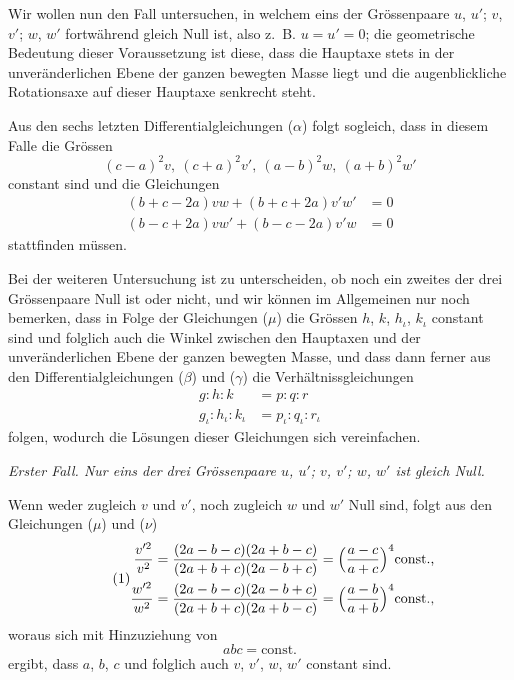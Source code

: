\documentclass[12pt,a4paper]{article}
\begin{document}
Wir wollen nun den Fall untersuchen, in welchem eins der Grössenpaare $u$, $u'$; $v$, $v'$; $w$, $w'$ fortwährend gleich Null ist, also z.~B. $u = u' = 0$; die geometrische Bedeutung dieser Voraussetzung ist diese, dass die Hauptaxe stets in der unveränderlichen Ebene der ganzen bewegten Masse liegt und die augenblickliche Rotationsaxe auf dieser Hauptaxe senkrecht steht.

Aus den sechs letzten Differentialgleichungen ($\alpha$) folgt sogleich, dass in diesem Falle die Grössen
\begin{equation}
\tag{$\mu$} (c-a)^2v,\ (c+a)^2v',\ (a-b)^2w,\ (a+b)^2w' \end{equation}
constant sind und die Gleichungen
\begin{equation}
\tag{$\nu$}
\begin{aligned} (b+c-2a)vw + (b+c+2a)v'w' &= 0\\ (b-c+2a)vw' + (b-c-2a)v'w &= 0 \end{aligned}
\end{equation}
stattfinden müssen.

Bei der weiteren Untersuchung ist zu unterscheiden, ob noch ein zweites der drei Grössenpaare Null ist oder nicht, und wir können im Allgemeinen nur noch bemerken, dass in Folge der Gleichungen ($\mu$) die Grössen $h$, $k$, $h_\iota$, $k_\iota$ constant sind und folglich auch die Winkel zwischen den Hauptaxen und der unveränderlichen Ebene der ganzen bewegten Masse, und dass dann ferner aus den Differentialgleichungen ($\beta$) und ($\gamma$) die Verhältnissgleichungen
\begin{align*} g : h : k &= p : q : r\\ g_\iota : h_\iota : k_\iota &= p_\iota : q_\iota : r_\iota \end{align*}
folgen, wodurch die Lösungen dieser Gleichungen sich vereinfachen.

\textit{Erster Fall. Nur eins der drei Grössenpaare $u$, $u'$; $v$, $v'$; $w$, $w'$ ist gleich Null.}

Wenn weder zugleich $v$ und $v'$, noch zugleich $w$ und $w'$ Null sind, folgt aus den Gleichungen ($\mu$) und ($\nu$)
\begin{equation}
\tag{1}
\begin{aligned} \frac{v'^2}{v^2} &= \frac{(2a-b-c)(2a+b-c)}{(2a+b+c)(2a-b+c)} = \Bigl(\frac{a-c}{a+c}\Bigr)^4\text{const.,}\\ \frac{w'^2}{w^2} &= \frac{(2a-b-c)(2a-b+c)}{(2a+b+c)(2a+b-c)} = \Bigl(\frac{a-b}{a+b}\Bigr)^4\text{const.,} \end{aligned}
\end{equation}
woraus sich mit Hinzuziehung von
\[ abc = \text{const.} \]
ergibt, dass $a$, $b$, $c$ und folglich auch $v$, $v'$, $w$, $w'$ constant sind.
\end{document}
